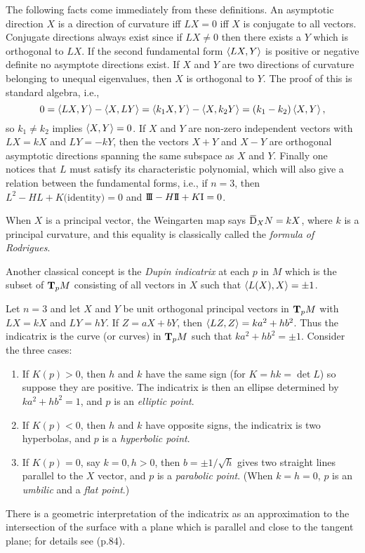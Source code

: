 \documentclass[../main]{subfiles}
\begin{document}
The following facts come immediately from these definitions. An asymptotic direction $X$ is a direction of curvature iff $LX=0$ iff $X$ is conjugate to all vectors. Conjugate directions always exist since if $LX\neq 0$ then there exists a $Y$ which is orthogonal to $LX$. If the second fundamental form $\ip{LX}{Y}$ is positive or negative definite no asymptote directions exist. If $X$ and $Y$ are two directions of curvature belonging to unequal eigenvalues, then $X$ is orthogonal to $Y$. The proof of this is standard algebra, i.e.,
\begin{equation*}
    0=\ip{LX}{Y}-\ip{X}{LY}=\ip{k_1X}{Y}-\ip{X}{k_2Y}=(k_1-k_2)\ip{X}{Y},
\end{equation*}
so $k_1\neq k_2$ implies $\ip{X}{Y}=0$. If $X$ and $Y$ are non-zero independent vectors with $LX=kX$ and $LY=-kY$, then the vectors $X+Y$ and $X-Y$ are orthogonal asymptotic directions spanning the same subspace as $X$ and $Y$. Finally one notices that $L$ must satisfy its characteristic polynomial, which will also give a relation between the fundamental forms, i.e., if $n=3$, then $L^2-HL+K\text{(identity)}=0$ and $\thirdForm-H\secondForm+K\firstForm=0$.

When $X$ is a principal vector, the Weingarten map says $\covariant_XN=kX$, where $k$ is a principal curvature, and this equality is classically called the \emph{formula of Rodrigues}.

Another classical concept is the \emph{Dupin indicatrix} at each $p$ in $M$ which is the subset of $\tangentspace{M}{p}$ consisting of all vectors in $X$ such that $\ip{L(X)}{X}=\pm 1$.

Let $n=3$ and let $X$ and $Y$ be unit orthogonal principal vectors in $\tangentspace{M}{p}$ with $LX=kX$ and $LY=hY$. If $Z=aX+bY$, then $\ip{LZ}{Z}=ka^2+hb^2$. Thus the indicatrix is the curve (or curves) in $\tangentspace{M}{p}$ such that $ka^2+hb^2=\pm 1$. Consider the three cases:
\begin{enumerate}
    \item If $K(p)>0$, then $h$ and $k$ have the same sign (for $K=hk=\det L$) so suppose they are positive. The indicatrix is then an ellipse determined by $ka^2+hb^2=1$, and $p$ is an \emph{elliptic point}.
    \item If $K(p)<0$, then $h$ and $k$ have opposite signs, the indicatrix is two hyperbolas, and $p$ is a \emph{hyperbolic point}.
    \item If $K(p)=0$, say $k=0,h>0$, then $b=\pm 1/\sqrt{h}$ gives two straight lines parallel to the $X$ vector, and $p$ is a \emph{parabolic point}. (When $k=h=0$, $p$ is an \emph{umbilic} and a \emph{flat point}.)
\end{enumerate}
There is a geometric interpretation of the indicatrix as an approximation to the intersection of the surface with a plane which is parallel and close to the tangent plane; for details see \cite{struik1961lectures} (p.84).
\end{document}

